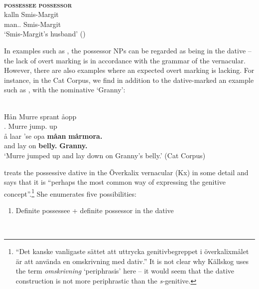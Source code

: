 \ea\label{}
	\\
	\glll \textbf{\textsc{possessee}} \textbf{\textsc{possessor}} \\
	kalln  Smis-Margit \\
	man.{}.{\sg}  Smis-Margit\\
\glt ‘Smis-Margit’s husband’ (\citet[97]{Levander1909})
\z

In examples such as , the possessor NPs can be regarded as being in the dative – the lack of overt marking is in accordance with the grammar of the vernacular. However, there are also examples where an expected overt marking is lacking. For instance, in the Cat Corpus, we find in addition to the dative-marked  an example such as , with the nominative  ‘Granny’: 

\renewcommand{\eachwordone}{\itshape} 
\renewcommand{\eachwordtwo}{\upshape}

\ea\label{}
\\
\gll Hån  Murre  sprant  åopp\\
{\pda}.{\m}  Murre  jump.{\pst}  up\\
\gll å  laar  ’se  opa  \textbf{måan} \textbf{mårmora.}\\
and  lay  {}  on  \textbf{belly.{}} \textbf{Granny.{}}\\
\glt ‘Murre jumped up and lay down on Granny’s belly.’ (Cat Corpus)
\z

\citet[161--163]{Källskog1992} treats the possessive dative in the Överkalix vernacular (Kx) in some detail and says that it is “perhaps the most common way of expressing the genitive concept”.\footnote{ “Det kanske vanligaste sättet att uttrycka genitivbegreppet i överkalixmålet är att använda en omskrivning med dativ.” It is not clear why Källskog uses the term \textit{omskrivning} ‘periphrasis’ here – it would seem that the dative construction is not more periphrastic than the \textit{s-}genitive.} She enumerates five possibilities:

\begin{enumerate}
\item[1] Definite possessee + definite possessor in the dative
\end{enumerate}


\renewcommand{\eachwordone}{\scshape}
\renewcommand{\eachwordtwo}{\itshape}  
\ea\label{}
\\


